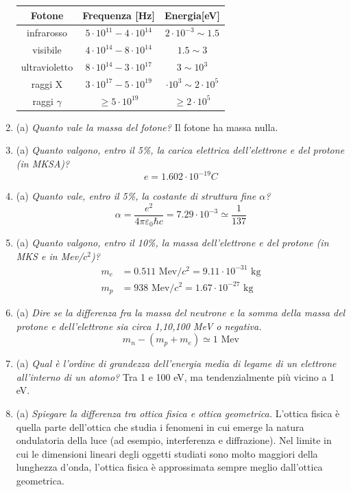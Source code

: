 \documentclass{article}
\renewcommand{\a}{(a)}
\renewcommand{\t}[1]{\textit{ #1}}
\begin{document}
\begin{enumerate}
		\begin{center}\begin{tabular}{c c c}
			Fotone&Frequenza [Hz]&Energia[eV]\\\hline
			infrarosso&$5\cdot10^{11}-4\cdot10^{14}$&$2\cdot10^{-3}\sim1.5$\\
			visibile&$4\cdot10^{14}-8\cdot10^{14}$&$1.5\sim3$\\
			ultravioletto&$8\cdot10^{14}-3\cdot10^{17}$&$3\sim10^{3}$\\
			raggi X&$3\cdot10^{17}-5\cdot10^{19}$&$\cdot10^{3}\sim2\cdot10^{5}$\\
			raggi $\gamma$&$\geq5\cdot10^{19}$&$\geq 2\cdot10^{5}$\\
		\end{tabular}\end{center}
		\item\a\t{Quanto vale la massa del fotone?} Il fotone ha massa nulla.
		\item\a\t{Quanto valgono, entro il 5\%, la carica elettrica dell'elettrone e del protone (in MKSA)?}
		\[e=1.602\cdot10^{-19}C\]
		\item\a\t{Quanto vale, entro il 5\%, la costante di struttura fine $\alpha$?}
		\[\alpha=\frac{e^2}{4\pi\varepsilon_0\hbar c}=7.29\cdot10^{-3}\simeq\frac{1}{137}\]
		\item\a\t{Quanto valgono, entro il 10\%, la massa dell'elettrone e del protone (in MKS e in \rm{Mev}/$c^2$)?}
		\begin{align*}
			m_e&=0.511\textrm{ Mev/}c^2=9.11\cdot10^{-31}\textrm{ kg}\\m_p&=938\textrm{ Mev}/c^2=1.67\cdot10^{-27}\textrm{ kg}
		\end{align*}
		\item\a\t{Dire se la differenza fra la massa del neutrone e la somma della massa del protone e dell'elettrone sia circa 1,10,100 \rm{MeV} o negativa.}
		\[m_n-(m_p+m_e)\simeq 1\textrm{ Mev}\]
		\item\a\t{Qual è l'ordine di grandezza dell'energia media di legame di un elettrone all'interno di un atomo?} Tra 1 e 100 eV, ma tendenzialmente più vicino a 1 eV.
		\item\a\t{Spiegare la differenza tra ottica fisica e ottica geometrica.} L'ottica fisica è quella parte dell'ottica che studia i fenomeni in cui emerge la natura ondulatoria della luce (ad esempio, interferenza e diffrazione). Nel limite in cui le dimensioni lineari degli oggetti studiati sono molto maggiori della lunghezza d'onda, l'ottica fisica è approssimata sempre meglio dall'ottica geometrica.

\end{enumerate}
\end{document}
